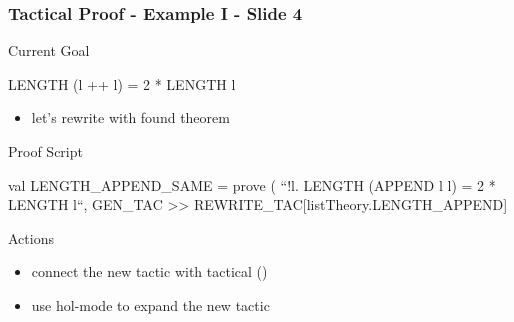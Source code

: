 \begin{frame}[fragile]
\frametitle{Tactical Proof - Example I - Slide 4}

\begin{block}{Current Goal}
\begin{semiverbatim}\small
LENGTH (l ++ l) = 2 * LENGTH l
\end{semiverbatim}
\end{block}

\begin{itemize}
\item let's rewrite with found theorem 
\end{itemize}

\begin{block}{Proof Script}
\begin{semiverbatim}\small
val LENGTH_APPEND_SAME = prove (
  ``!l. LENGTH (APPEND l l) = 2 * LENGTH l``,
GEN_TAC >>
REWRITE_TAC[listTheory.LENGTH\_APPEND]
\end{semiverbatim}
\end{block}

\begin{block}{Actions}
\begin{itemize}
\item connect the new tactic with tactical \hol{>>} ()
\item use hol-mode to expand the new tactic
\end{itemize}
\end{block}
\end{frame}






